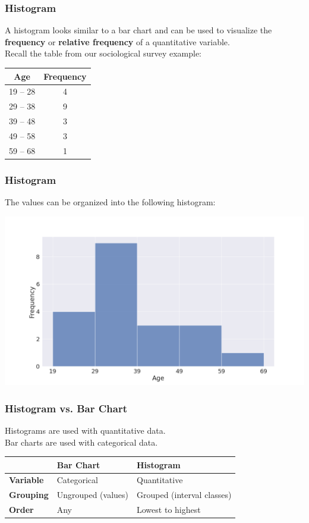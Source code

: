 \documentclass[aspectratio=169,11pt,svgnames]{beamer}
\begin{document}
\begin{frame}
 \frametitle{Histogram}
 A histogram looks similar to a bar chart and can be used to visualize the
 \textbf{frequency} or \textbf{relative frequency} of a \alert{quantitative
 variable}.\\
 \pause
 Recall the table from our sociological survey example:
 \begin{center}
  \begin{tabular}{c|c}
   \textbf{Age} & \textbf{Frequency}\\
   \toprule
   19 -- 28 & 4\\
   29 -- 38 & 9\\
   39 -- 48 & 3\\
   49 -- 58 & 3\\
   59 -- 68 & 1
  \end{tabular}
 \end{center}
\end{frame}

\begin{frame}
 \frametitle{Histogram}
 The values can be organized into the following histogram:
 \begin{center}
  \includegraphics[width=.7\textwidth]{survey_hist.png}
 \end{center}
\end{frame}

\begin{frame}
 \frametitle{Histogram vs. Bar Chart}
 Histograms are used with \alert{quantitative} data.\\
 \pause
 Bar charts are used with \alert{categorical} data.\\
 \pause
 \begin{center}
  \begin{tabular}{lll}
   & \textbf{Bar Chart} & \textbf{Histogram}\\
   \toprule
   \textbf{Variable} & Categorical & Quantitative\\
   \midrule
   \textbf{Grouping} & Ungrouped (values) & Grouped (interval classes)\\
   \midrule
   \textbf{Order} & Any & Lowest to highest
  \end{tabular}
 \end{center}
\end{frame}
\end{document}
